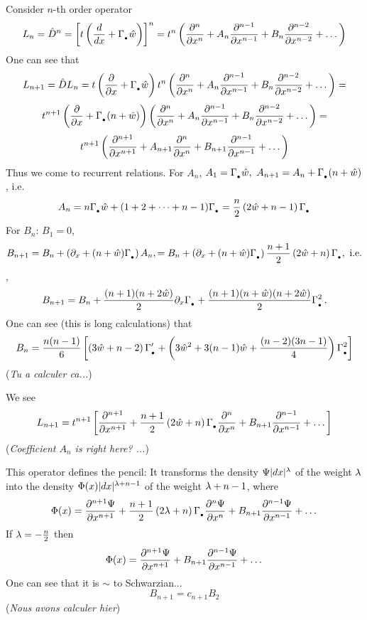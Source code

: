  Consider $n$-th order operator
          $$
      L_n=\hat D^n=\left[t\left({d\over dx}+\Gamma_{_{\bullet}}\hat w\right)\right]^n=
      t^n\left({\partial^n\over \partial x^n}+A_n{\partial^{n-1}\over \partial x^{n-1}}+B_n{\partial^{n-2}\over \partial x^{n-2}}+\dots\right)
          $$
       One can see that
            $$
L_{n+1}=\hat D L_n=t\left({\partial\over \partial x}+\Gamma_{_{\bullet}}\hat w\right)t^n
\left({\partial^n\over \partial x^n}+A_n{\partial^{n-1}\over \partial x^{n-1}}+B_n{\partial^{n-2}\over \partial x^{n-2}}+\dots\right)=
            $$
            $$
            t^{n+1}\left({\partial\over \partial x}+\Gamma_{_{\bullet}}(n+\hat w)\right)
\left({\partial^n\over \partial x^n}+A_n{\partial^{n-1}\over \partial x^{n-1}}+B_n{\partial^{n-2}\over \partial x^{n-2}}+\dots\right)=
            $$
            $$
            t^{n+1}\left({\partial^{n+1}\over \partial x^{n+1}}+A_{n+1}{\partial^{n}\over \partial x^{n}}+
            B_{n+1}{\partial^{n-1}\over \partial x^{n-1}}+\dots\right)
            $$
Thus we come to recurrent relations. For ${A_n}$,
            $A_1=\Gamma_{_{\bullet}} \hat w,\,\, A_{n+1}=A_n+\Gamma_{_{\bullet}}(n+\hat w)$, i.e.
           $$
        A_n=n\Gamma_{_{\bullet}} \hat w+(1+2+\dots+n-1)\Gamma_{_{\bullet}}={n\over 2}\left(2\hat w+n-1\right)\Gamma_{_{\bullet}}
            $$
For $B_n$: $B_1=0$, $$B_{n+1}=B_n+\left(\partial_x+(n+\hat w)\Gamma_{_{\bullet}}\right)A_n,
           =B_n+\left(\partial_x+(n+\hat w)\Gamma_{_{\bullet}}\right){n+1\over 2}\left(2\hat w+n\right)\Gamma_{_{\bullet}},\,\,{\rm i.e.}$$,
           $$
   B_{n+1}=B_n+{(n+1)(n+2\hat w)\over 2}\partial_x\Gamma_{_{\bullet}}+{(n+1)(n+\hat w)(n+2\hat w)\over 2}\Gamma_{_{\bullet}}^2\,.
           $$
One can see (this  is long calculations) that
            $$
            B_{n}={n(n-1)\over 6}
            \left[
            \left(
            3\hat w+n-2
            \right)
            \Gamma_{_{\bullet}}^\prime+
           \left(
           3\hat w^2+3(n-1)\hat w+
            {(n-2)(3n-1)\over 4}
           \right)\Gamma_{_{\bullet}}^2
           \right]
            $$
({\it Tu a calculer ca...})

We see
         $$
   L_{n+1}= t^{n+1}\left[{\partial^{n+1}\over \partial x^{n+1}}+
          {n+1\over 2}\left(2\hat w+n\right)\Gamma_{_{\bullet}}{\partial^{n}\over \partial x^{n}}+
                B_{n+1}
            {\partial^{n-1}\over \partial x^{n-1}}+\dots\right]
         $$
({\it Coefficient $A_n$ is right here? ...})

 This operator defines the pencil:  It transforms the density $\Psi|dx|^\lambda$ of the weight $\lambda$ into the density
 $\Phi(x)|dx|^{\lambda+n-1}$ of the weight $\lambda+n-1$, where
          $$
   \Phi(x)={\partial^{n+1}\Psi\over \partial x^{n+1}}+
   {n+1\over 2}\left(2\lambda+n\right)\Gamma_{_{\bullet}} {\partial^{n}\Psi\over \partial x^{n}}+
              B_{n+1}
            {\partial^{n-1}\Psi\over \partial x^{n-1}}+\dots
          $$
If $\lambda=-{n\over 2}$ then
            $$
            \Phi(x)={\partial^{n+1}\Psi\over \partial x^{n+1}}+B_{n+1}
            {\partial^{n-1}\Psi\over \partial x^{n-1}}+\dots
            $$
One can see that it is $\sim$ to Schwarzian...
           $$
         B_{n+1}=c_{n+1}B_2
           $$
({\it Nous avons calculer hier})
\bigskip

